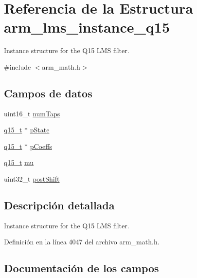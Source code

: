\hypertarget{structarm__lms__instance__q15}{}\section{Referencia de la Estructura arm\+\_\+lms\+\_\+instance\+\_\+q15}
\label{structarm__lms__instance__q15}


Instance structure for the Q15 L\+MS filter.  




{\ttfamily \#include $<$arm\+\_\+math.\+h$>$}

\subsection*{Campos de datos}
\begin{DoxyCompactItemize}
\item 
uint16\+\_\+t \hyperlink{structarm__lms__instance__q15_a751941891e47f522a7f5375fe8990aac}{num\+Taps}
\item 
\hyperlink{arm__math_8h_ab5a8fb21a5b3b983d5f54f31614052ea}{q15\+\_\+t} $\ast$ \hyperlink{structarm__lms__instance__q15_ae29dfdb736374fcddaeaec4b7770170c}{p\+State}
\item 
\hyperlink{arm__math_8h_ab5a8fb21a5b3b983d5f54f31614052ea}{q15\+\_\+t} $\ast$ \hyperlink{structarm__lms__instance__q15_a7ca181a37f714d174445f486bebce26f}{p\+Coeffs}
\item 
\hyperlink{arm__math_8h_ab5a8fb21a5b3b983d5f54f31614052ea}{q15\+\_\+t} \hyperlink{structarm__lms__instance__q15_aab4745770bd667de040227eec1b5ff8d}{mu}
\item 
uint32\+\_\+t \hyperlink{structarm__lms__instance__q15_aa2cacddfc5e1d86905d7d31a18b1979b}{post\+Shift}
\end{DoxyCompactItemize}


\subsection{Descripción detallada}
Instance structure for the Q15 L\+MS filter. 

Definición en la línea 4047 del archivo arm\+\_\+math.\+h.



\subsection{Documentación de los campos}
